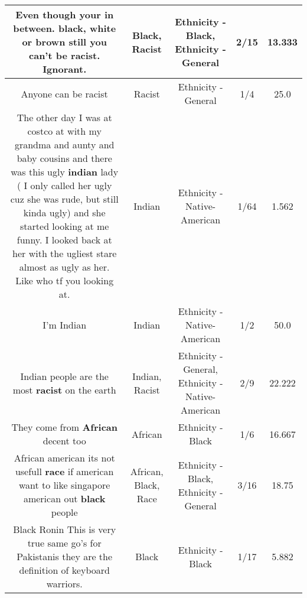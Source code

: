 \documentclass[11pt]{article}
\newlength\mylength
\begin{document}
\begin{center}
\begin{longtable}{|C{.65\mylength}|C{.30\mylength}|C{.12\mylength}|C{.12\mylength}|C{.12\mylength}|}
  \small Even though your in between. \textbf{black}, white or brown still you can't be \textbf{racist}. Ignorant.\normalsize   & Black, Racist & Ethnicity - Black, Ethnicity - General & 2/15 & 13.333 \\  \hline
  \small Anyone can be racist\normalsize   & Racist & Ethnicity - General & 1/4 & 25.0 \\  \hline
  \small The other day I was at costco at with my grandma and aunty and baby cousins and there was this ugly \textbf{indian} lady ( I only called her ugly cuz she was rude, but still kinda ugly) and she started looking at me funny.  I looked back at her with the ugliest stare almost as ugly as her.  Like who tf you looking at.\normalsize   & Indian & Ethnicity - Native-American & 1/64 & 1.562 \\  \hline
  \small I'm Indian\normalsize   & Indian & Ethnicity - Native-American & 1/2 & 50.0 \\  \hline
  \small Indian people are the most \textbf{racist} on the earth\normalsize   & Indian, Racist & Ethnicity - General, Ethnicity - Native-American & 2/9 & 22.222 \\  \hline
  \small They come from \textbf{African} decent too\normalsize   & African & Ethnicity - Black & 1/6 & 16.667 \\  \hline
  \small African american its not usefull \textbf{race} if american want to like singapore american out \textbf{black} people\normalsize   & African, Black, Race & Ethnicity - Black, Ethnicity - General & 3/16 & 18.75 \\  \hline
  \small Black Ronin This is very true same go's for Pakistanis they are the definition of keyboard warriors.\normalsize   & Black & Ethnicity - Black & 1/17 & 5.882 \\  \hline

\end{longtable}
\end{center}
\end{document}
